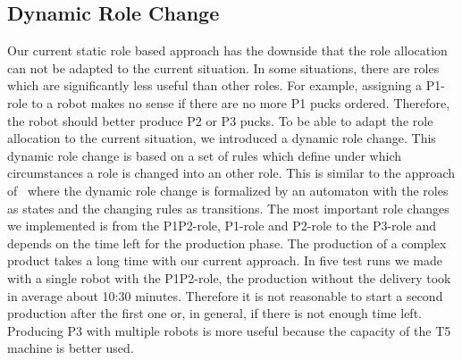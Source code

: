 \subsection{Dynamic Role Change}
Our current static role based approach has the downside that the role allocation can not be adapted to the current situation. In some situations, there are roles which are significantly less useful than other roles. For example, assigning a P1-role to a robot makes no sense if there are no more P1 pucks ordered. Therefore, the robot should better produce P2 or P3 pucks. To be able to adapt the role allocation to the current situation, we introduced a dynamic role change. This dynamic role change is based on a set of rules which define under which circumstances a role is changed into an other role. This is similar to the approach of~\cite{dynamic_role_assignment} where the dynamic role change is formalized by an automaton with the roles as states and the changing rules as transitions. The most important role changes we implemented is from the P1P2-role, P1-role and P2-role to the P3-role and depends on the time left for the production phase. The production of a complex product takes a long time with our current approach. In five test runs we made with a single robot with the P1P2-role, the production without the delivery took in average about 10:30 minutes. Therefore it is not reasonable to start a second production after the first one or, in general, if there is not enough time left. Producing P3 with multiple robots is more useful because the capacity of the T5 machine is better used.

